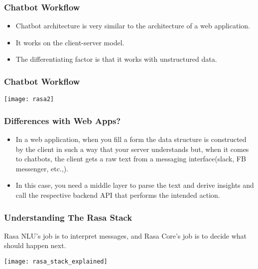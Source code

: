 \begin{frame}[fragile]\frametitle{Chatbot Workflow}

\begin{itemize}
\item Chatbot architecture is very similar to the architecture of a web application. 
\item It works on the client-server model. 
\item The differentiating factor is that it works with unstructured data.
\end{itemize}

\end{frame}


\begin{frame}[fragile]\frametitle{Chatbot Workflow}
\begin{center}
\texttt{[image: rasa2]}
\end{center}

\end{frame}


\begin{frame}[fragile]\frametitle{Differences with Web Apps?}

\begin{itemize}
\item In a web application, when you fill a form the data structure is constructed by the client in such a way that your server understands but, when it comes to chatbots, the client gets a raw text from a messaging interface(slack, FB messenger, etc.,). 
\item In this case, you need a middle layer to parse the text and derive insights and call the respective backend API that performs the intended action.
\end{itemize}

\end{frame}

 \begin{frame}[fragile]\frametitle{Understanding The Rasa Stack}
Rasa NLU's job is to interpret messages, and Rasa Core's job is to decide what should happen next.

\begin{center}
\texttt{[image: rasa\_stack\_explained]}
\end{center}

\end{frame}

